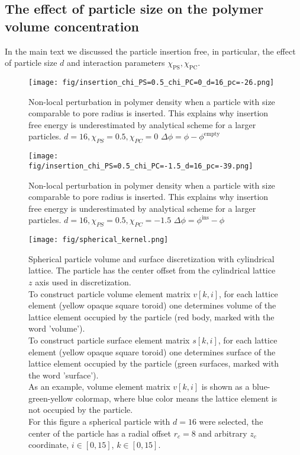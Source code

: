 \documentclass[12pt, a4paper]{article}
\begin{document}
\subsection*{The effect of particle size on the polymer volume concentration}
In the main text we discussed the particle insertion free, in particular, the effect of particle size $d$ and interaction parameters $\chi_{\textrm{PS}}, \chi_{\textrm{PC}}$.


\begin{figure}
    \centering
    \texttt{[image: fig/insertion\_chi\_PS=0.5\_chi\_PC=0\_d=16\_pc=-26.png]}
    \caption{
        Non-local perturbation in polymer density when a particle with size comparable to pore radius is inserted. This explains why insertion free energy is underestimated by analytical scheme for a larger particles.
        $d=16, \chi_{PS} = 0.5, \chi_{PC} = 0$
        $\Delta \phi = \phi - \phi^{\textrm{empty}}$
        }
    \label{fig:particle_insertion_0}
\end{figure}
\begin{figure}
    \centering
    \texttt{[image: fig/insertion\_chi\_PS=0.5\_chi\_PC=-1.5\_d=16\_pc=-39.png]}
    \caption{
        Non-local perturbation in polymer density when a particle with size comparable to pore radius is inserted. This explains why insertion free energy is underestimated by analytical scheme for a larger particles.
        $d=16, \chi_{PS} = 0.5, \chi_{PC} = -1.5$
        $\Delta \phi = \phi^{\textrm{ins}} - \phi$
        }
    \label{fig:particle_insertion_1}
\end{figure}



\begin{figure}
    \centering
    \texttt{[image: fig/spherical\_kernel.png]}
    \caption{
        Spherical particle volume and surface discretization with cylindrical lattice.
        The particle has the center offset from the cylindrical lattice $z$ axis used in discretization.
        \\
        To construct particle volume element matrix $v[k,i]$, for each lattice element (yellow opaque square toroid) one determines volume of the lattice element occupied by the particle (red body, marked with the word 'volume').
        \\
        To construct particle surface element matrix $s[k,i]$, for each lattice element (yellow opaque square toroid) one determines surface of the lattice element occupied by the particle (green surfaces, marked with the word 'surface').
        \\
        As an example, volume element matrix $v[k,i]$ is shown as a blue-green-yellow colormap, 
        where blue color means the lattice element is not occupied by the particle.
        \\
        For this figure a spherical particle with $d=16$ were selected, the center of the particle has a radial offset $r_c=8$ and arbitrary $z_c$ coordinate,
        $i \in [0,15]$, $k \in [0,15]$.
    }
    \label{fig:spherical_kernel}
\end{figure}
\end{document}

